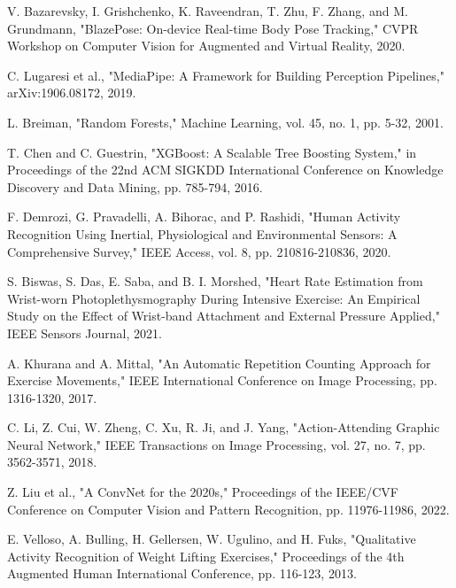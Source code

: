 \documentclass[conference]{IEEEtran}
\begin{document}
\begin{thebibliography}{00}
 V. Bazarevsky, I. Grishchenko, K. Raveendran, T. Zhu, F. Zhang, and M. Grundmann, "BlazePose: On-device Real-time Body Pose Tracking," CVPR Workshop on Computer Vision for Augmented and Virtual Reality, 2020.

 C. Lugaresi et al., "MediaPipe: A Framework for Building Perception Pipelines," arXiv:1906.08172, 2019.

 L. Breiman, "Random Forests," Machine Learning, vol. 45, no. 1, pp. 5-32, 2001.

 T. Chen and C. Guestrin, "XGBoost: A Scalable Tree Boosting System," in Proceedings of the 22nd ACM SIGKDD International Conference on Knowledge Discovery and Data Mining, pp. 785-794, 2016.

 F. Demrozi, G. Pravadelli, A. Bihorac, and P. Rashidi, "Human Activity Recognition Using Inertial, Physiological and Environmental Sensors: A Comprehensive Survey," IEEE Access, vol. 8, pp. 210816-210836, 2020.

 S. Biswas, S. Das, E. Saba, and B. I. Morshed, "Heart Rate Estimation from Wrist-worn Photoplethysmography During Intensive Exercise: An Empirical Study on the Effect of Wrist-band Attachment and External Pressure Applied," IEEE Sensors Journal, 2021.

 A. Khurana and A. Mittal, "An Automatic Repetition Counting Approach for Exercise Movements," IEEE International Conference on Image Processing, pp. 1316-1320, 2017.

 C. Li, Z. Cui, W. Zheng, C. Xu, R. Ji, and J. Yang, "Action-Attending Graphic Neural Network," IEEE Transactions on Image Processing, vol. 27, no. 7, pp. 3562-3571, 2018.

 Z. Liu et al., "A ConvNet for the 2020s," Proceedings of the IEEE/CVF Conference on Computer Vision and Pattern Recognition, pp. 11976-11986, 2022.

 E. Velloso, A. Bulling, H. Gellersen, W. Ugulino, and H. Fuks, "Qualitative Activity Recognition of Weight Lifting Exercises," Proceedings of the 4th Augmented Human International Conference, pp. 116-123, 2013.
\end{thebibliography}
\end{document}
